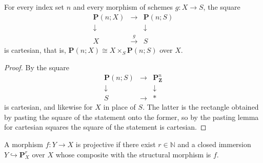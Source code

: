 \begin{lemma}
  \label{lemma:nagata-projective-space-base-change-pullback}
  \leanok

  For every index set $n$ and every morphism of schemes $g\colon X\to S$, the
  square
  \[
    \begin{array}{ccc}
      \mathbf P(n;X) & \longrightarrow & \mathbf P(n;S)\\
      \downarrow & & \downarrow\\
      X & \xrightarrow{\ g\ } & S
    \end{array}
  \]
  is cartesian, that is, $\mathbf P(n;X)\cong X\times_S\mathbf P(n;S)$ over
  $X$.
\end{lemma}

\begin{proof}
  \leanok
  By  the square
  \[
    \begin{array}{ccc}
      \mathbf P(n;S) & \longrightarrow & \mathbf P^n_{\mathbf Z}\\
      \downarrow & & \downarrow\\
      S & \longrightarrow & \ast
    \end{array}
  \]
  is cartesian, and likewise for $X$ in place of $S$.  The latter is the
  rectangle obtained by pasting the square of the statement onto the former,
  so by the pasting lemma for cartesian squares the square of the statement is
  cartesian.
\end{proof}

\begin{definition}
  \label{def:nagata-projective-morphism}

  A morphism $f\colon Y\to X$ is projective if there exist $r\in\mathbb N$
  and a closed immersion $Y\hookrightarrow\mathbf P^r_X$ over $X$ whose
  composite with the structural morphism is $f$.
\end{definition}

